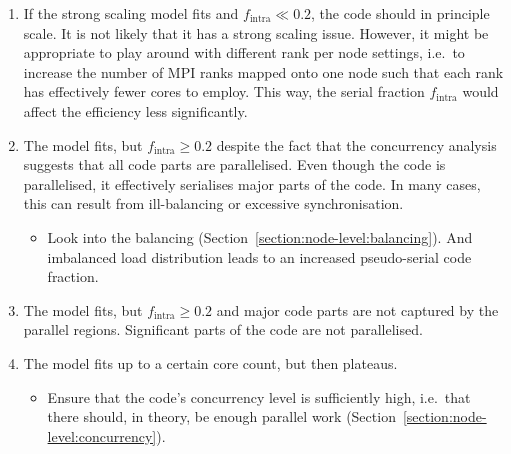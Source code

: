\begin{enumerate}
  \item[$\boxtimes$] If the strong scaling model fits and $f_{\text{intra}} \ll 0.2$, the code should in principle scale. 
    It is not likely that it has a strong scaling issue. 
    However, it might be appropriate to play around with different rank per node settings, i.e.~to increase the number of MPI ranks mapped onto one node such that each rank has effectively fewer cores to employ. 
    This way, the serial fraction $f_{\text{intra}}$ would affect the efficiency less significantly.  
  \item[$\boxtimes$] The model fits, but $f_{\text{intra}} \geq 0.2$ despite the fact that the concurrency analysis suggests that all code parts are parallelised.
    Even though the code is parallelised, it effectively serialises major parts of the code. 
    In many cases, this can result from ill-balancing or excessive synchronisation.
    \begin{itemize}
      \item[$\Rightarrow $] Look into the balancing (Section~\ref{section:node-level:balancing}). And imbalanced load distribution leads to an increased pseudo-serial code fraction. 
    \end{itemize}
  \item[$\boxtimes$] The model fits, but $f_{\text{intra}} \geq 0.2$ and major code parts are not captured by the parallel regions.
    Significant parts of the code are not parallelised.
  \item[$\boxtimes$] The model fits up to a certain core count, but then plateaus.
    \begin{itemize}
      \item[$\Rightarrow $] Ensure that the code's concurrency level is sufficiently high, i.e.~that there should, in theory, be enough parallel work (Section~\ref{section:node-level:concurrency}).
    \end{itemize}
\end{enumerate}





